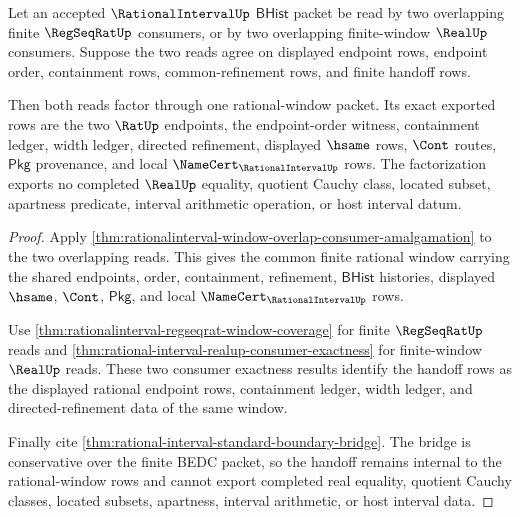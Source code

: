 \begin{theorem}
\label{thm:rationalinterval-overlap-regseqrat-handoff-exactness}
Let an accepted $\RationalIntervalUp$ $\mathsf{BHist}$ packet be read by two overlapping finite $\RegSeqRatUp$ consumers, or by two overlapping finite-window $\RealUp$ consumers. Suppose the two reads agree on displayed endpoint rows, endpoint order, containment rows, common-refinement rows, and finite handoff rows.

Then both reads factor through one rational-window packet. Its exact exported rows are the two $\RatUp$ endpoints, the endpoint-order witness, containment ledger, width ledger, directed refinement, displayed $\hsame$ rows, $\Cont$ routes, $\mathsf{Pkg}$ provenance, and local $\NameCert_{\RationalIntervalUp}$ rows. The factorization exports no completed $\RealUp$ equality, quotient Cauchy class, located subset, apartness predicate, interval arithmetic operation, or host interval datum.
\end{theorem}
\begin{proof}
Apply \autoref{thm:rationalinterval-window-overlap-consumer-amalgamation} to the two overlapping reads. This gives the common finite rational window carrying the shared endpoints, order, containment, refinement, $\mathsf{BHist}$ histories, displayed $\hsame$, $\Cont$, $\mathsf{Pkg}$, and local $\NameCert_{\RationalIntervalUp}$ rows.

Use \autoref{thm:rationalinterval-regseqrat-window-coverage} for finite $\RegSeqRatUp$ reads and \autoref{thm:rational-interval-realup-consumer-exactness} for finite-window $\RealUp$ reads. These two consumer exactness results identify the handoff rows as the displayed rational endpoint rows, containment ledger, width ledger, and directed-refinement data of the same window.

Finally cite \autoref{thm:rational-interval-standard-boundary-bridge}. The bridge is conservative over the finite BEDC packet, so the handoff remains internal to the rational-window rows and cannot export completed real equality, quotient Cauchy classes, located subsets, apartness, interval arithmetic, or host interval data.
\end{proof}
